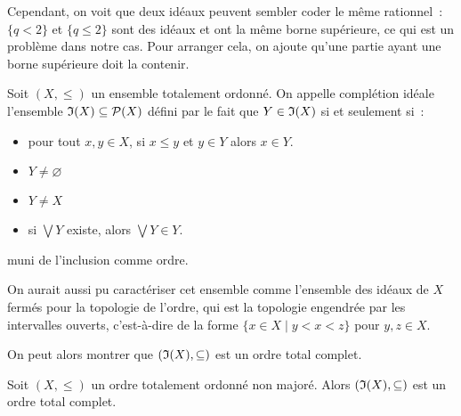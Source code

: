 Cependant, on voit que deux idéaux peuvent sembler coder le même rationnel~:
$\{q < 2\}$ et $\{q \leq 2\}$ sont des idéaux et ont la même borne supérieure,
ce qui est un problème dans notre cas. Pour arranger cela, on ajoute qu'une
partie ayant une borne supérieure doit la contenir.

\begin{definition}
  Soit $(X,\leq)$ un ensemble totalement ordonné. On appelle complétion idéale
  l'ensemble $\mathfrak{I}(X)\subseteq \mathcal{P}(X)$ défini par le fait que
  $Y\in \mathfrak{I}(X)$ si et seulement si~:
  \begin{itemize}
  \item pour tout $x,y\in X$, si $x\leq y$ et $y \in Y$ alors $x\in Y$.
  \item $Y\neq \varnothing$
  \item $Y\neq X$
  \item si $\bigvee Y$ existe, alors $\bigvee Y \in Y$.
  \end{itemize}
  muni de l'inclusion comme ordre.
\end{definition}

\begin{remark}
  On aurait aussi pu caractériser cet ensemble comme l'ensemble des idéaux de
  $X$ fermés pour la topologie de l'ordre, qui est la topologie engendrée par
  les intervalles ouverts, c'est-à-dire de la forme $\{x \in X\mid y < x < z\}$
  pour $y,z\in X$.
\end{remark}

On peut alors montrer que $(\mathfrak{I}(X),\subseteq)$ est un ordre total complet.

\begin{proposition}
  Soit $(X,\leq)$ un ordre totalement ordonné non majoré. Alors
  $(\mathfrak{I}(X),\subseteq)$ est un ordre total complet.
\end{proposition}

